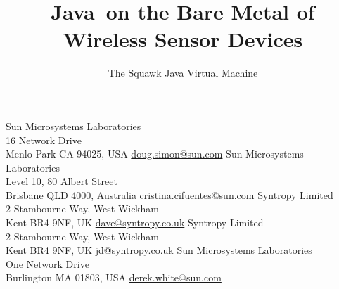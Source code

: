\documentclass{sigplanconf}
\begin{document}
\Sunpermission


\title{Java\texttrademark\ on the Bare Metal of Wireless Sensor Devices}
\subtitle{The Squawk Java Virtual Machine}
	{Sun Microsystems Laboratories \\
        16 Network Drive \\
	Menlo Park CA 94025, USA} 
	{\url{doug.simon@sun.com}}
	{Sun Microsystems Laboratories\\
	Level 10, 80 Albert Street \\ 
	Brisbane QLD 4000, Australia}
        {\url{cristina.cifuentes@sun.com}}
	{Syntropy Limited \\
	2 Stambourne Way, West Wickham \\
	Kent BR4 9NF, UK}
	{\url{dave@syntropy.co.uk}}
	{Syntropy Limited \\
	2 Stambourne Way, West Wickham \\
	Kent BR4 9NF, UK}
	{\url{jd@syntropy.co.uk}}
	{Sun Microsystems Laboratories \\
	One Network Drive \\
	Burlington MA 01803, USA}
	{\url{derek.white@sun.com}}
\maketitle
\end{document}
